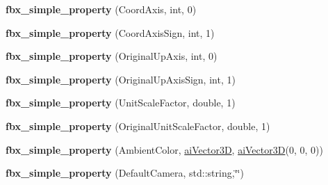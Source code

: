 \begin{DoxyCompactItemize}
\item 
\hypertarget{class_assimp_1_1_f_b_x_1_1_file_global_settings_a56240410a84b30df6f579d2ffbc7e6e6}{{\bfseries fbx\+\_\+simple\+\_\+property} (Coord\+Axis, int, 0)}\label{class_assimp_1_1_f_b_x_1_1_file_global_settings_a56240410a84b30df6f579d2ffbc7e6e6}

\item 
\hypertarget{class_assimp_1_1_f_b_x_1_1_file_global_settings_a7a7322cb2910debd411a8bcd6281d905}{{\bfseries fbx\+\_\+simple\+\_\+property} (Coord\+Axis\+Sign, int, 1)}\label{class_assimp_1_1_f_b_x_1_1_file_global_settings_a7a7322cb2910debd411a8bcd6281d905}

\item 
\hypertarget{class_assimp_1_1_f_b_x_1_1_file_global_settings_a3ecef007a2e9aa1b32d59e6bd9650bf7}{{\bfseries fbx\+\_\+simple\+\_\+property} (Original\+Up\+Axis, int, 0)}\label{class_assimp_1_1_f_b_x_1_1_file_global_settings_a3ecef007a2e9aa1b32d59e6bd9650bf7}

\item 
\hypertarget{class_assimp_1_1_f_b_x_1_1_file_global_settings_ae50e878c9b1d446b6a07b67a34b9f4e8}{{\bfseries fbx\+\_\+simple\+\_\+property} (Original\+Up\+Axis\+Sign, int, 1)}\label{class_assimp_1_1_f_b_x_1_1_file_global_settings_ae50e878c9b1d446b6a07b67a34b9f4e8}

\item 
\hypertarget{class_assimp_1_1_f_b_x_1_1_file_global_settings_aa2190650b027d58de56f96f3f45ccbaa}{{\bfseries fbx\+\_\+simple\+\_\+property} (Unit\+Scale\+Factor, double, 1)}\label{class_assimp_1_1_f_b_x_1_1_file_global_settings_aa2190650b027d58de56f96f3f45ccbaa}

\item 
\hypertarget{class_assimp_1_1_f_b_x_1_1_file_global_settings_ad0696160569eb780fe261ed8b0b803cd}{{\bfseries fbx\+\_\+simple\+\_\+property} (Original\+Unit\+Scale\+Factor, double, 1)}\label{class_assimp_1_1_f_b_x_1_1_file_global_settings_ad0696160569eb780fe261ed8b0b803cd}

\item 
\hypertarget{class_assimp_1_1_f_b_x_1_1_file_global_settings_ad432a1efde84d031551f9d992c26ed22}{{\bfseries fbx\+\_\+simple\+\_\+property} (Ambient\+Color, \hyperlink{structai_vector3_d}{ai\+Vector3\+D}, \hyperlink{structai_vector3_d}{ai\+Vector3\+D}(0, 0, 0))}\label{class_assimp_1_1_f_b_x_1_1_file_global_settings_ad432a1efde84d031551f9d992c26ed22}

\item 
\hypertarget{class_assimp_1_1_f_b_x_1_1_file_global_settings_a4180fc91bd740c4b928bd2af02fccc06}{{\bfseries fbx\+\_\+simple\+\_\+property} (Default\+Camera, std\+::string,\char`\"{}\char`\"{})}\label{class_assimp_1_1_f_b_x_1_1_file_global_settings_a4180fc91bd740c4b928bd2af02fccc06}


\end{DoxyCompactItemize}
